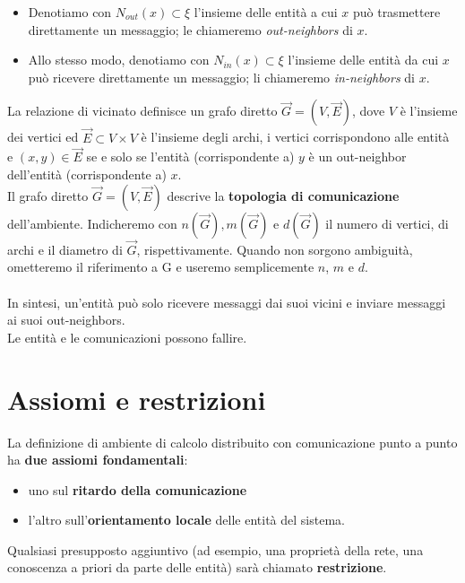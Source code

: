 \begin{itemize}
    \item Denotiamo con $N_{out}(x) \subset \xi$ l'insieme delle entità a cui $x$
          può trasmettere direttamente un messaggio; le chiameremo
          \textit{out-neighbors} di $x$.
    \item  Allo stesso modo, denotiamo con $N_{in}(x) \subset \xi$ l'insieme delle
          entità da cui $x$ può ricevere direttamente un messaggio; li chiameremo
          \textit{in-neighbors} di $x$.
\end{itemize}

La relazione di vicinato definisce un grafo diretto $\overrightarrow{G} = (V ,
    \overrightarrow{E})$, dove $V$ è l'insieme dei vertici ed $\overrightarrow{E}
    \subset V \times V$ è l'insieme degli archi, i vertici corrispondono alle
entità e $(x, y) \in \overrightarrow{E}$ se e solo se l'entità (corrispondente
a) $y$ è un out-neighbor dell'entità (corrispondente a) $x$.\\
Il grafo diretto $\overrightarrow{G} = (V , \overrightarrow{E})$ descrive la
\textbf{topologia di comunicazione} dell'ambiente. Indicheremo con
$n(\overrightarrow{G}), m(\overrightarrow{G})$ e $d(\overrightarrow{G})$ il
numero di vertici, di archi e il diametro di $\overrightarrow{G}$,
rispettivamente. Quando non sorgono ambiguità, ometteremo il riferimento a G e
useremo semplicemente $n$, $m$ e $d$.\\\\
In sintesi, un'entità può solo ricevere messaggi dai suoi vicini e inviare
messaggi ai suoi out-neighbors.\\
Le entità e le comunicazioni possono fallire.

\section{Assiomi e restrizioni}
La definizione di ambiente di calcolo distribuito con comunicazione punto a
punto ha \textbf{due assiomi fondamentali}:

\begin{itemize}
    \item uno sul \textbf{ritardo della comunicazione}
    \item  l'altro sull'\textbf{orientamento locale} delle entità del sistema.
\end{itemize}

Qualsiasi presupposto aggiuntivo (ad esempio, una proprietà della rete, una
conoscenza a priori da parte delle entità) sarà chiamato \textbf{restrizione}.

